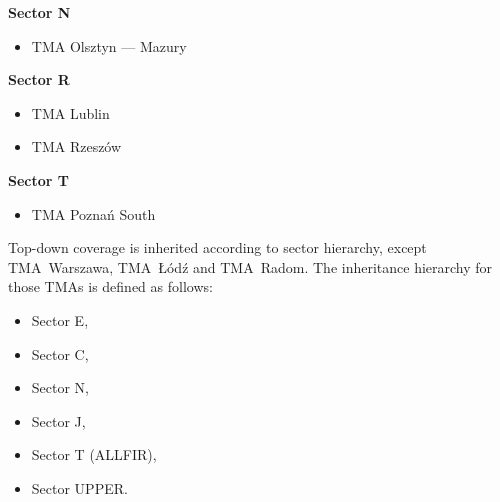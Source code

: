 \begin{multicols}{2}
  \textbf{Sector N}
  \begin{itemize}
  \item TMA Olsztyn --- Mazury
  \end{itemize}

  \textbf{Sector R}
  \begin{itemize}
  \item TMA Lublin
  \item TMA Rzeszów
  \end{itemize}

  \textbf{Sector T}
  \begin{itemize}
  \item TMA Poznań South
  \end{itemize}
\end{multicols}

Top-down coverage is inherited according to sector hierarchy, except
TMA~Warszawa, TMA~Łódź and TMA~Radom. The inheritance hierarchy for those TMAs
is defined as follows:
\begin{itemize}
\item Sector E,
\item Sector C,
\item Sector N,
\item Sector J,
\item Sector T (ALLFIR),
\item Sector UPPER.
\end{itemize}

